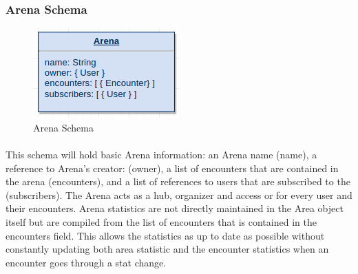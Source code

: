 \documentclass[12pt,a4paper]{report}
\begin{document}
	\subsubsection{Arena Schema}
	
	\begin{figure}[h]
		\centering
		\includegraphics[scale=.75]{schema-arena}
		\caption{Arena Schema}
		\label{fig: Arena Schema }
	\end{figure}
	
	\paragraph{}This schema will hold basic Arena information: an Arena name (name), a reference to Arena's creator: (owner), a list of encounters that are contained in the arena (encounters), and a list of references to users that are subscribed to the (subscribers). The Arena acts as a hub, organizer and access or for every user and their encounters. Arena statistics are not directly maintained in the Area object itself but are compiled from the list of encounters that is contained in the encounters field. This allows the statistics as up to date as possible without constantly updating both area statistic and the encounter statistics when an encounter goes through a stat change.
	
\end{document}
